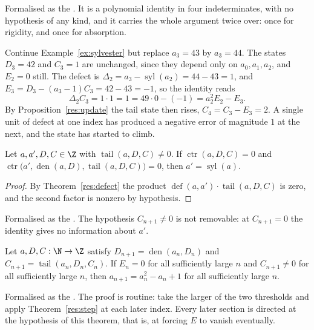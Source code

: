 \documentclass[11pt]{article}
\newcommand{\sylnext}{\operatorname{syl}}
\newcommand{\den}{\operatorname{den}}
\newcommand{\tail}{\operatorname{tail}}
\newcommand{\ctr}{\operatorname{ctr}}
\newcommand{\defect}{\operatorname{def}}
\begin{document}
\noindent Formalised as the
.  It is a polynomial identity in four indeterminates, with no
hypothesis of any kind, and it carries the whole argument twice over: once for
rigidity, and once for absorption.

\begin{example}\label{ex:defect}
Continue Example~\ref{ex:sylvester} but replace $a_3=43$ by $a_3=44$.  The
states $D_3=42$ and $C_3=1$ are unchanged, since they depend only on
$a_0,a_1,a_2$, and $E_2=0$ still.  The defect is
$\Delta_2=a_3-\sylnext(a_2)=44-43=1$, and
$E_3=D_3-(a_3-1)C_3=42-43=-1$, so the identity reads
\[
 \Delta_2C_3=1\cdot1=1=49\cdot0-(-1)=a_2^{2}E_2-E_3 .
\]
By Proposition~\ref{res:update} the tail state then rises, $C_4=C_3-E_3=2$.  A
single unit of defect at one index has produced a negative error of magnitude
$1$ at the next, and the state has started to climb.
\end{example}

\begin{theorem}\label{res:step}
Let $a,a',D,C\in\Z$ with $\tail(a,D,C)\ne0$.  If
$\ctr(a,D,C)=0$ and $\ctr\bigl(a',\den(a,D),\tail(a,D,C)\bigr)=0$, then
$a'=\sylnext(a)$.
\end{theorem}

\begin{proof}
By Theorem~\ref{res:defect} the product $\defect(a,a')\cdot\tail(a,D,C)$ is
zero, and the second factor is nonzero by hypothesis.
\end{proof}

\noindent Formalised as the
.  The hypothesis $C_{n+1}\ne0$ is not removable: at $C_{n+1}=0$
the identity gives no information about $a'$.

\begin{theorem}\label{res:eventual}
Let $a,D,C:\N\to\Z$ satisfy $D_{n+1}=\den(a_n,D_n)$ and
$C_{n+1}=\tail(a_n,D_n,C_n)$.  If $E_n=0$ for all sufficiently large $n$ and
$C_{n+1}\ne0$ for all sufficiently large $n$, then $a_{n+1}=a_n^{2}-a_n+1$ for
all sufficiently large $n$.
\end{theorem}

\noindent Formalised as the
.  The proof is routine: take the larger of the two
thresholds and apply Theorem~\ref{res:step} at each later index.  Every later
section is directed at the hypothesis of this theorem, that is, at forcing $E$
to vanish eventually.
\end{document}
